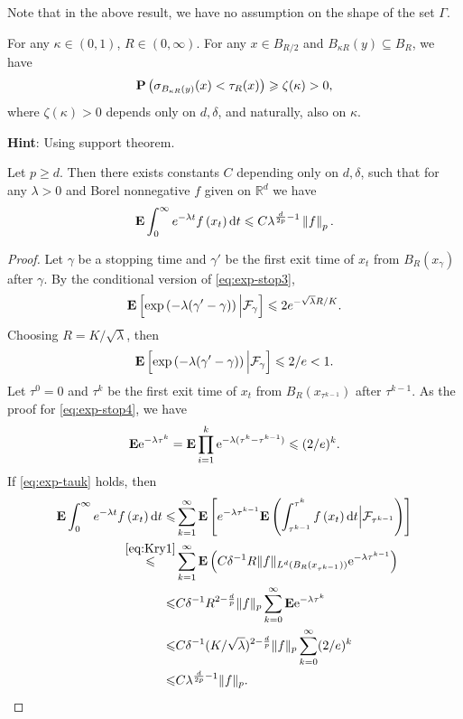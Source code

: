 Note that in the above result, we have no assumption on the shape of the set $\Gamma$. 
\begin{exercise}
    For any $\kappa \in(0,1)$, $R \in(0, \infty)$. For any $x\in B_{R/2}$ and $B_{\kappa R}(y)\subseteq B_R$, we have 
    \[
        {\mathbf P}\left(\sigma_{B_{\kappa R}(y)} (x) <\tau_{R}(x) \right)\geqslant \zeta(\kappa)>0,  
    \]
    where $\zeta(\kappa)>0$ depends only on $d, \delta$, and naturally, also on $\kappa$.
\end{exercise}
{\bf Hint}: Using support theorem. 
	
\begin{theorem}\label{thm:Kry}
    Let $p \geq d$. Then there exists constants $C$ depending only on $d, \delta$, such that for any $\lambda>0$ and Borel nonnegative $f$ given on $\mathbb{R}^d$ we have
    \begin{equation}\label{eq:Kry2}
        {\mathbf E} \int_0^{\infty} e^{-\lambda t} f\left(x_t\right) \text{\rm{d}} t \leqslant C\lambda^{\frac{d}{2p}-1}  \left\|f\right\|_{p}.  
    \end{equation}
\end{theorem}
\begin{proof}
    Let $\gamma$ be a stopping time and $\gamma'$ be the first exit time of $x_t$ from $B_{R}(x_{\gamma})$ after $\gamma$.  By the conditional version of \eqref{eq:exp-stop3}, 
    \[
        {\mathbf E} \left[ \exp \left(-\lambda (\gamma'-\gamma)\right)\Big| {\mathcal F}_{\gamma} \right] \leqslant 2 e^{-\sqrt{\lambda} R/K}. 
    \]
    Choosing $R=K/\sqrt{\lambda}$, then 
    \[
        {\mathbf E} \left[ \exp \left(-\lambda (\gamma'-\gamma)\right)\Big| {\mathcal F}_{\gamma} \right] \leqslant 2/e<1. 
    \]
    Let $\tau^0=0$ and $\tau^k$ be the first exit time of $x_t$ from $B_{R}(x_{\tau^{k-1}})$ after $\tau^{k-1}$. As the proof for \eqref{eq:exp-stop4}, we have \begin{equation}\label{eq:exp-tauk}
        {\mathbf E} \mathrm{e}^{-\lambda \tau^k} = {\mathbf E} \prod_{i=1}^k \mathrm{e}^{-\lambda (\tau^k-\tau^{k-1})} \leqslant (2/e)^k. 
    \end{equation}
    If \eqref{eq:exp-tauk} holds, then 
    \begin{align*}
        {\mathbf E} \int_0^{\infty} e^{-\lambda t} f\left(x_t\right) \text{\rm{d}} t\leqslant& \sum_{k=1}^{\infty} {\mathbf E} \left [e^{-\lambda \tau^{k-1}} {\mathbf E} \left( \int_{\tau^{k-1}}^{\tau^{k}}  f\left(x_t\right) \text{\rm{d}} t \Big| {\mathcal F}_{\tau^{k-1}} \right) \right]\\
        \overset{\eqref{eq:Kry1}}{\leqslant} &\sum_{k=1}^{\infty} {\mathbf E}  \left(  C\delta^{-1}R\|f\|_{L^d(B_{R}(x_{\tau^{k-1}}))} \mathrm{e}^{-\lambda \tau^{k-1}} \right)\\
        \leqslant & C \delta^{-1} R^{2-\frac{d}{p}}\|f\|_{p} \sum_{k=0}^\infty  {\mathbf E} \mathrm{e}^{-\lambda \tau^k}  \\
        \leqslant&  C \delta^{-1} (K/\sqrt{\lambda})^{2-\frac{d}{p}} \|f\|_{p} \sum_{k=0}^\infty (2/e)^k\\
        \leqslant & C \lambda^{\frac{d}{2p}-1}\|f\|_p. 
    \end{align*}
\end{proof}
	
